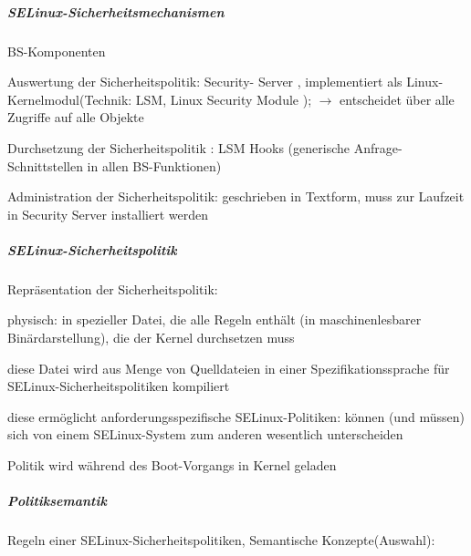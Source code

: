 \documentclass[a4paper]{article}
\begin{document}
\begin{multicols}{3}
    \subparagraph{SELinux-Sicherheitsmechanismen}

    BS-Komponenten

    \begin{itemize*}
        \item
        Auswertung der Sicherheitspolitik: Security- Server , implementiert
        als Linux-Kernelmodul(Technik: LSM, Linux Security Module );
        $\rightarrow$ entscheidet über alle Zugriffe auf alle
        Objekte
        \item
        Durchsetzung der Sicherheitspolitik : LSM Hooks (generische
        Anfrage-Schnittstellen in allen BS-Funktionen)
        \item
        Administration der Sicherheitspolitik: geschrieben in Textform, muss
        zur Laufzeit in Security Server installiert werden
    \end{itemize*}




    \subparagraph{SELinux-Sicherheitspolitik}

    Repräsentation der Sicherheitspolitik:

    \begin{itemize*}
        \item
        physisch: in spezieller Datei, die alle Regeln enthält (in
        maschinenlesbarer Binärdarstellung), die der Kernel durchsetzen muss
        \item
        diese Datei wird aus Menge von Quelldateien in einer
        Spezifikationssprache für SELinux-Sicherheitspolitiken kompiliert
        \item
        diese ermöglicht anforderungsspezifische SELinux-Politiken: können
        (und müssen) sich von einem SELinux-System zum anderen wesentlich
        unterscheiden
        \item
        Politik wird während des Boot-Vorgangs in Kernel geladen
    \end{itemize*}


    \subparagraph{Politiksemantik}

    Regeln einer SELinux-Sicherheitspolitiken, Semantische
    Konzepte(Auswahl):


\end{multicols}
\end{document}
